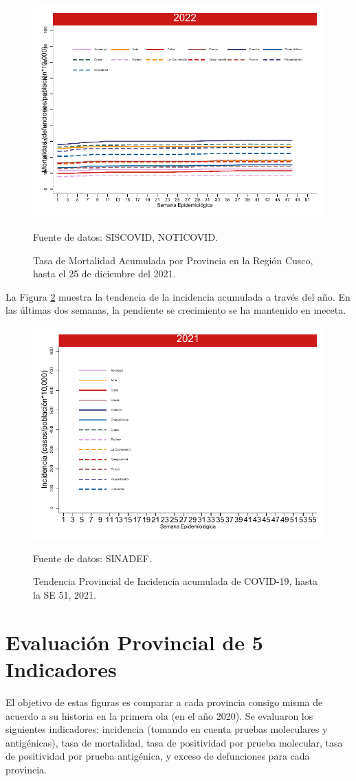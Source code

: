 \documentclass[12pt,a4paper,openany]{book}
\begin{document}
\begin{figure}[h]
	\caption{Tasa de Mortalidad Acumulada por Provincia en la Región Cusco, hasta el 25 de diciembre del 2021. }\label{fig:mortalidad_ordenada}
	\begin{center}
		\includegraphics[width=0.65\linewidth]{../figuras/mortalidad_provincial}
	\end{center}
	{\footnotesize {Fuente de datos: SISCOVID, NOTICOVID.}}
\end{figure}

La Figura \ref{fig:incidencia_provincial} muestra la tendencia de la incidencia acumulada a través del año. En las últimas dos semanas, la pendiente se crecimiento se ha mantenido en meceta. 
%
\begin{figure}[h]
	\caption{Tendencia Provincial de Incidencia acumulada de COVID-19, hasta la SE 51, 2021. }\label{fig:incidencia_provincial}
	\begin{center}
		\includegraphics[width=0.65\linewidth]{../figuras/incidencia_provincial_2021.pdf}
	\end{center}
	{\footnotesize {Fuente de datos: SINADEF.}}
\end{figure}

\clearpage
	
\section*{Evaluación Provincial de 5 Indicadores}
		\noindent El objetivo de estas figuras es comparar a cada provincia consigo misma de acuerdo a su historia  en la primera ola (en el año 2020). Se evaluaron los siguientes indicadores: incidencia (tomando en cuenta pruebas moleculares y antigénicas), tasa de mortalidad, tasa de positividad por prueba molecular, tasa de positividad por prueba antigénica, y exceso de defunciones para cada provincia.
		
\end{document}
